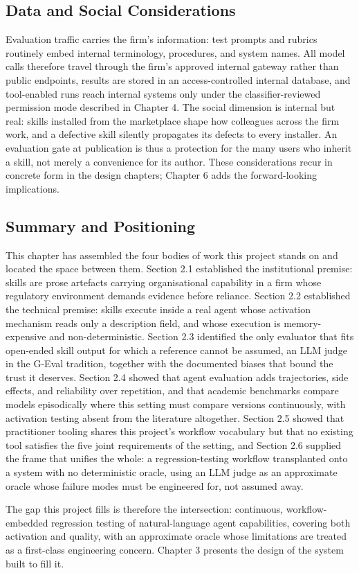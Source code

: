 \subsection{Data and Social Considerations}
Evaluation traffic carries the firm's information: test prompts and rubrics routinely embed internal terminology, procedures, and system names. All model calls therefore travel through the firm's approved internal gateway rather than public endpoints, results are stored in an access-controlled internal database, and tool-enabled runs reach internal systems only under the classifier-reviewed permission mode described in Chapter 4. The social dimension is internal but real: skills installed from the marketplace shape how colleagues across the firm work, and a defective skill silently propagates its defects to every installer. An evaluation gate at publication is thus a protection for the many users who inherit a skill, not merely a convenience for its author. These considerations recur in concrete form in the design chapters; Chapter 6 adds the forward-looking implications.

\subsection{Summary and Positioning}
This chapter has assembled the four bodies of work this project stands on and located the space between them. Section 2.1 established the institutional premise: skills are prose artefacts carrying organisational capability in a firm whose regulatory environment demands evidence before reliance. Section 2.2 established the technical premise: skills execute inside a real agent whose activation mechanism reads only a description field, and whose execution is memory-expensive and non-deterministic. Section 2.3 identified the only evaluator that fits open-ended skill output for which a reference cannot be assumed, an LLM judge in the G-Eval tradition, together with the documented biases that bound the trust it deserves. Section 2.4 showed that agent evaluation adds trajectories, side effects, and reliability over repetition, and that academic benchmarks compare models episodically where this setting must compare versions continuously, with activation testing absent from the literature altogether. Section 2.5 showed that practitioner tooling shares this project's workflow vocabulary but that no existing tool satisfies the five joint requirements of the setting, and Section 2.6 supplied the frame that unifies the whole: a regression-testing workflow transplanted onto a system with no deterministic oracle, using an LLM judge as an approximate oracle whose failure modes must be engineered for, not assumed away.

The gap this project fills is therefore the intersection: continuous, workflow-embedded regression testing of natural-language agent capabilities, covering both activation and quality, with an approximate oracle whose limitations are treated as a first-class engineering concern. Chapter 3 presents the design of the system built to fill it.